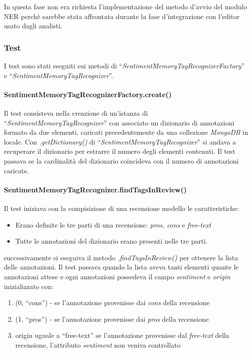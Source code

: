 In questa fase non era richiesta l'implementazione del metodo d'avvio del modulo
\gls{NER} perchè sarebbe stata affrontata durante la fase d'integrazione con
l'editor usato dagli analisti.

\subsubsection{Test}
I test sono stati eseguiti sui metodi di
``\textit{SentimentMemoryTagRecognizerFactory}'' e
``\textit{SentimentMemoryTagRecognizer}''.

\paragraph{SentimentMemoryTagRecognizerFactory.create()}
Il test consisteva nella creazione di un'istanza di
``\textit{SentimentMemoryTagRecognizer}'' con associato un dizionario di
annotazioni formato da due elementi, caricati precedentemente da una collezione
\textit{MongoDB} in locale. Con \textit{.getDictionary()} di
``\textit{SentimentMemoryTagRecognizer}'' si andava a recuperare il dizionario
per estrarre il numero degli elementi contenuti. Il test passava se la
cardinalità del dizionario coincideva con il numero di annotazioni caricate.

\paragraph{SentimentMemoryTagRecognizer.findTagsInReview()}
Il test iniziava con la compisizione di una recensione modello le
caratteristiche:
\begin{itemize}
\item Erano definite le tre parti di una recensione: \textit{pros, cons} e
\textit{free-text}
\item Tutte le annotazioni del dizionario erano presenti nelle tre parti.
\end{itemize}
successivamente si eseguiva il metodo \textit{.findTagsInReview()} per ottenere
la lista delle annotazioni. Il test passava quando la lista aveva tanti elementi
quante le annotazioni attese e ogni annotazioni possedeva il campo
\textit{sentiment} e \textit{origin} inizializzato con:
\begin{enumerate}
\item (0, ``cons'') - se l'annotazione provenisse dai \textit{cons} della
recensione
\item (1, ``pros'') - se l'annotazione provenisse dai \textit{pros} della
recensione
\item origin uguale a ``free-text'' se l'annotazione provenisse dal
\textit{free-text} della recensione, l'attributo \textit{sentiment} non veniva
controllato
\end{enumerate}

